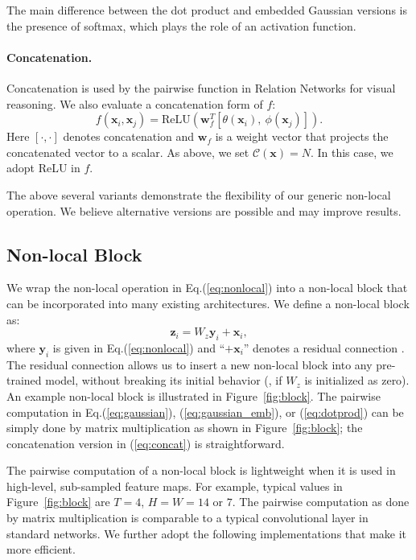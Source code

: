 \documentclass[10pt,twocolumn,letterpaper]{article}
\newcommand{\ve}[1]{\mathbf{#1}} %
\begin{document}
The main difference between the dot product and embedded Gaussian versions is the presence of softmax, which plays the role of an activation function.

\paragraph{Concatenation.} Concatenation is used by the pairwise function in Relation Networks \cite{Santoro2017} for visual reasoning. We also evaluate a concatenation form of $f$:
\begin{equation}\label{eq:concat}
f(\ve{x}_i, \ve{x}_j) = \text{{ReLU}}(\ve{w}^T_f[\theta(\ve{x}_i),~\phi(\ve{x}_j)]).
\end{equation}
Here $[\cdot, \cdot]$ denotes concatenation and $\ve{w}_f$ is a weight vector that projects the concatenated vector to a scalar. As above, we set $\mathcal{C}(\ve{x})=N$. In this case, we adopt ReLU \cite{Nair2010} in $f$.

\vspace{1em} The above several variants demonstrate the flexibility of our generic non-local operation. We believe alternative versions are possible and may improve results.

\subsection{Non-local Block}

We wrap the non-local operation in Eq.(\ref{eq:nonlocal}) into a non-local block that can be incorporated into many existing architectures. We define a non-local block as:
\begin{equation}\label{eq:block}
\ve{z}_i = W_z \ve{y}_i + \ve{x}_i,
\end{equation}
where $\ve{y}_i$ is given in Eq.(\ref{eq:nonlocal}) and ``$+ \ve{x}_i$'' denotes a residual connection \cite{He2016}. The residual connection allows us to insert a new non-local block into any pre-trained model, without breaking its initial behavior (\eg, if $W_z$ is initialized as zero).
An example non-local block is illustrated in Figure~\ref{fig:block}. The pairwise computation in Eq.(\ref{eq:gaussian}), (\ref{eq:gaussian_emb}), or (\ref{eq:dotprod}) can be simply done by matrix multiplication as shown in Figure~\ref{fig:block}; the concatenation version in (\ref{eq:concat}) is straightforward.

The pairwise computation of a non-local block is lightweight when it is used in high-level, sub-sampled feature maps. For example, typical values in Figure~\ref{fig:block} are $T=4$, $H=W=14$ or $7$. The pairwise computation as done by matrix multiplication is comparable to a typical convolutional layer in standard networks.
We further adopt the following implementations that make it more efficient.
\end{document}
